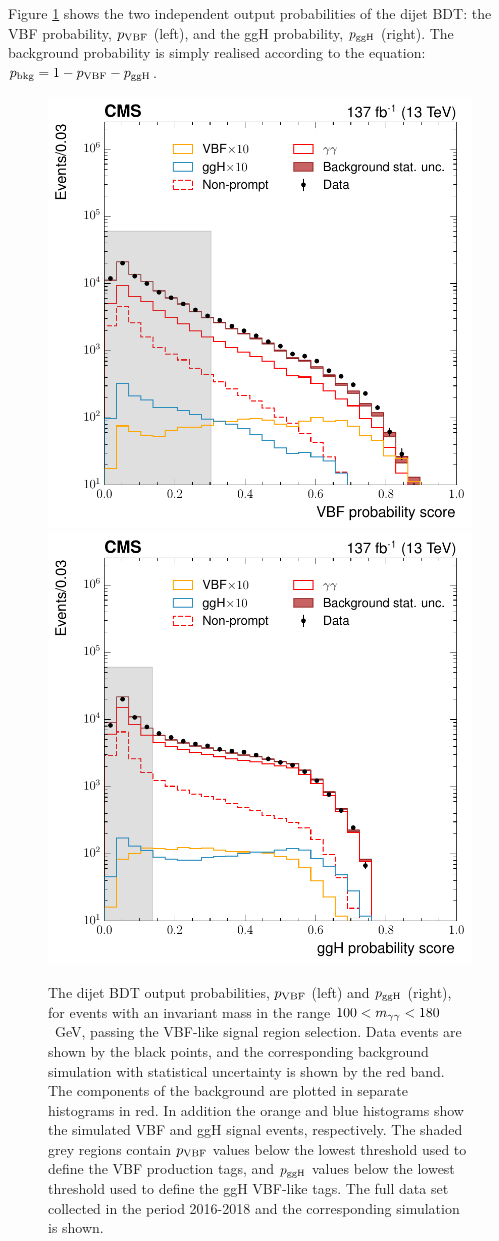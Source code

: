 Figure \ref{fig:dijetbdt_outputs} shows the two independent output probabilities of the dijet BDT: the VBF probability, $p_{\rm{VBF}}$ (left), and the ggH probability, $p_{\rm{ggH}}$ (right). The background probability is simply realised according to the equation: $p_{\rm{bkg}}=1-p_{\rm{VBF}}-p_{\rm{ggH}}$. 

\begin{figure}[htb!]
  \centering
  \includegraphics[width=.4\textwidth]{Figures/hgg_overview/DijetBDT_DD_vbfMvaResult_prob_VBF_logPlot.pdf}
  \includegraphics[width=.4\textwidth]{Figures/hgg_overview/DijetBDT_ggHprob.pdf}
  \caption[Dijet BDT output probabilities: $p_{\rm{VBF}}$ and $p_{\rm{ggH}}$]
  {
    The dijet BDT output probabilities, $p_{\rm{VBF}}$ (left) and $p_{\rm{ggH}}$ (right), for events with an invariant mass in the range $100<m_{\gamma\gamma}<180$~GeV, passing the VBF-like signal region selection. Data events are shown by the black points, and the corresponding background simulation with statistical uncertainty is shown by the red band. The components of the background are plotted in separate histograms in red. In addition the orange and blue histograms show the simulated VBF and ggH signal events, respectively. The shaded grey regions contain $p_{\rm{VBF}}$ values below the lowest threshold used to define the VBF production tags, and $p_{\rm{ggH}}$ values below the lowest threshold used to define the ggH VBF-like tags. The full data set collected in the period 2016-2018 and the corresponding simulation is shown.
  }
  \label{fig:dijetbdt_outputs}
\end{figure}

